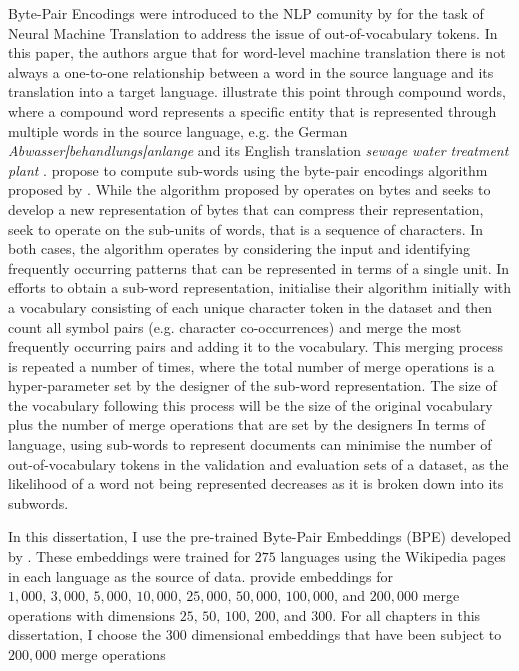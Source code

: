Byte-Pair Encodings were introduced to the NLP comunity by \cite{Sennrich:2016} for the task of Neural Machine Translation to address the issue of out-of-vocabulary tokens. In this paper, the authors argue that for word-level machine translation there is not always a one-to-one relationship between a word in the source language and its translation into a target language. \citet{Sennrich:2016} illustrate this point through compound words, where a compound word represents a specific entity that is represented through multiple words in the source language, e.g. the German \textit{Abwasser\textbf{|}behandlungs\textbf{|}anlange} and its English translation \textit{sewage water treatment plant} \citep{Sennrich:2016}.
\citet{Sennrich:2016} propose to compute sub-words using the byte-pair encodings algorithm proposed by \citet{Gage:1994}. While the algorithm proposed by \citet{Gage:1994} operates on bytes and seeks to develop a new representation of bytes that can compress their representation, \citet{Sennrich:2016} seek to operate on the sub-units of words, that is a sequence of characters. In both cases, the algorithm operates by considering the input and identifying frequently occurring patterns that can be represented in terms of a single unit.
In efforts to obtain a sub-word representation, \citet{Sennrich:2016} initialise their algorithm initially with a vocabulary consisting of each unique character token in the dataset and then count all symbol pairs (e.g. character co-occurrences) and merge the most frequently occurring pairs and adding it to the vocabulary. This merging process is repeated a number of times, where the total number of merge operations is a hyper-parameter set by the designer of the sub-word representation. The size of the vocabulary following this process will be the size of the original vocabulary plus the number of merge operations that are set by the designers \citep{Sennrich:2016}
In terms of language, using sub-words to represent documents can minimise the number of out-of-vocabulary tokens in the validation and evaluation sets of a dataset, as the likelihood of a word not being represented decreases as it is broken down into its subwords.

In this dissertation, I use the pre-trained Byte-Pair Embeddings (BPE) developed by \citet{Heinzerling:2018}. These embeddings were trained for $275$ languages using the Wikipedia pages in each language as the source of data. \citet{Heinzerling:2018} provide embeddings for $1,000,\, 3,000,\, 5,000,\, 10,000,\, 25,000,\, 50,000,\, 100,000$, and $200,000$ merge operations with dimensions $25,\, 50,\, 100,\, 200$, and $300$. For all chapters in this dissertation, I choose the $300$ dimensional embeddings that have been subject to $200,000$ merge operations

